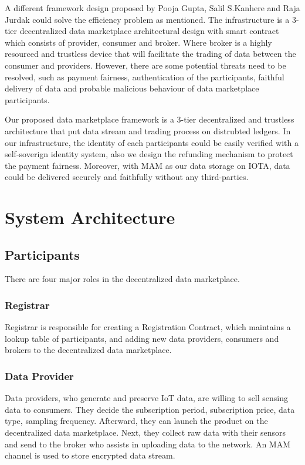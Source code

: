 \documentclass[journal,a4paper]{IEEEtran}
\begin{document}
A different framework design proposed by Pooja Gupta, Salil S.Kanhere and Raja Jurdak\cite{3tierDataMarket} could solve the efficiency problem as mentioned. The infrastructure is a 3-tier decentralized data marketplace architectural design with smart contract which consists of provider, consumer and broker. Where broker is a highly resourced and trustless device that will facilitate the trading of data between the consumer and providers. However, there are some potential threats need to be resolved, such as payment fairness, authentication of the participants, faithful delivery of data and probable malicious behaviour of data marketplace participants.  

Our proposed data marketplace framework is a 3-tier decentralized and trustless architecture that put data stream and trading process on distrubted ledgers. In our infrastructure, the identity of each participants could be easily verified with a self-soverign identity system, also we design the refunding mechanism to protect the payment fairness. Moreover, with MAM as our data storage on IOTA, data could be delivered securely and faithfully without any third-parties.


\section{System Architecture}
\subsection{Participants}
There are four major roles in the decentralized data marketplace.

\subsubsection{Registrar}
Registrar is responsible for creating a Registration Contract, which maintains a lookup table of participants, and adding new data providers, consumers and brokers to the decentralized data marketplace.

\subsubsection{Data Provider}
Data providers, who generate and preserve IoT data, are willing to sell sensing data to consumers. They decide the subscription period, subscription price, data type, sampling frequency. Afterward, they can launch the product on the decentralized data marketplace. Next, they collect raw data with their sensors and send to the broker who assists in uploading data to the network. An MAM channel\cite{MAM} is used to store encrypted data stream.
\end{document}
